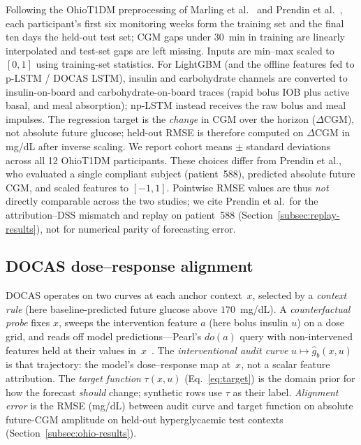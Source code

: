 \documentclass[a4paper,fleqn]{cas-sc}
\begin{document}
Following the OhioT1DM preprocessing of Marling et
al.~\citep{marling2020} and Prendin et al.~\citep{prendin2023}, each
participant's first six monitoring weeks form the training set and the final ten
days the held-out test set; CGM gaps under 30~min in training are linearly
interpolated and test-set gaps are left missing.\label{subsec:ohio-protocol}
Inputs are min--max scaled to
$[0,1]$ using training-set statistics. For LightGBM (and the offline features
fed to p-LSTM / DOCAS LSTM), insulin and carbohydrate channels are converted to
insulin-on-board and carbohydrate-on-board traces (rapid bolus IOB plus active
basal, and meal absorption); np-LSTM instead receives the raw bolus and meal
impulses. The regression target is the
\emph{change} in CGM over the horizon ($\Delta\mathrm{CGM}$), not absolute
future glucose; held-out RMSE is therefore computed on $\Delta\mathrm{CGM}$ in
mg/dL after inverse scaling. We report cohort means $\pm$ standard deviations
across all 12 OhioT1DM participants. These choices differ from Prendin et
al., who evaluated a single compliant subject (patient~588), predicted absolute
future CGM, and scaled features to $[-1,1]$. Pointwise RMSE values are
thus \emph{not} directly comparable across the two studies; we cite Prendin et
al.\ for the attribution--DSS mismatch and replay on patient~588
(Section~\ref{subsec:replay-results}), not for numerical parity of forecasting
error.

\subsection{DOCAS dose--response alignment}\label{subsec:probe}
DOCAS operates on two curves at each anchor context~$x$, selected by a
\emph{context rule} (here baseline-predicted future glucose above
$170$~mg/dL). A \emph{counterfactual probe} fixes $x$, sweeps the intervention
feature $a$ (here bolus insulin $u$) on a dose grid, and reads off model
predictions---Pearl's $do(a)$ query with non-intervened features held at their
values in~$x$~\citep{pearl2009causality}. The \emph{interventional audit
curve} $u\mapsto\hat g_b(x,u)$ is that trajectory: the model's dose--response
map at~$x$, not a scalar feature attribution. The \emph{target function}
$\tau(x,u)$ (Eq.~\ref{eq:target}) is the domain prior for how the forecast
\emph{should} change; synthetic rows use $\tau$ as their label.
\emph{Alignment error} is the RMSE (mg/dL) between audit curve and target function
on absolute future-CGM amplitude on held-out hyperglycaemic test contexts
(Section~\ref{subsec:ohio-results}).
\end{document}
